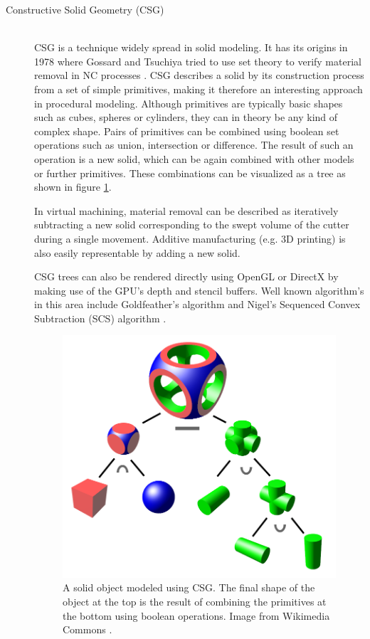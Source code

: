\begin{description}
	\item[Constructive Solid Geometry (CSG)] \hfill \\
	CSG is a technique widely spread in solid modeling.
	It has its origins in 1978 where Gossard and Tsuchiya tried to use set theory to verify material removal in NC processes \cite{csg}.
	CSG describes a solid by its construction process from a set of simple primitives, making it therefore an interesting approach in procedural modeling.
	Although primitives are typically basic shapes such as cubes, spheres or cylinders, they can in theory be any kind of complex shape.
	Pairs of primitives can be combined using boolean set operations such as union, intersection or difference.
	The result of such an operation is a new solid, which can be again combined with other models or further primitives.
	These combinations can be visualized as a tree as shown in figure \ref{fig:csg_tree}.
	
	In virtual machining, material removal can be described as iteratively subtracting a new solid corresponding to the swept volume of the cutter during a single movement.
	Additive manufacturing (e.g. 3D printing) is also easily representable by adding a new solid.
	
	CSG trees can also be rendered directly using OpenGL or DirectX by making use of the GPU's depth and stencil buffers.
	Well known algorithm's in this area include Goldfeather's algorithm \cite{goldfeather} and Nigel's Sequenced Convex Subtraction (SCS) algorithm \cite{scs}.
	
	\begin{figure}[h]
		\centering
		\includegraphics[width=\textwidth]{images/csg_tree}
		\caption{
			A solid object modeled using CSG.
			The final shape of the object at the top is the result of combining the primitives at the bottom using boolean operations.
			Image from Wikimedia Commons \cite{csg_tree}.
		}
		\label{fig:csg_tree}
	\end{figure}
	

\end{description}
